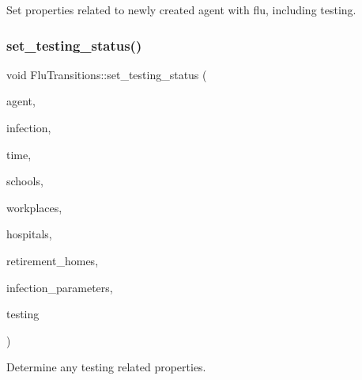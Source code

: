 Set properties related to newly created agent with flu, including testing. 

\mbox{\label{classFluTransitions_afc03327751ab451fff24c4d6a499f09f}} 
\subsubsection{\texorpdfstring{set\+\_\+testing\+\_\+status()}{set\_testing\_status()}}
{\footnotesize\ttfamily void Flu\+Transitions\+::set\+\_\+testing\+\_\+status (\begin{DoxyParamCaption}\item[{\hyperlink{classAgent}{Agent} \&}]{agent,  }\item[{\hyperlink{classInfection}{Infection} \&}]{infection,  }\item[{const double}]{time,  }\item[{std\+::vector$<$ \hyperlink{classSchool}{School} $>$ \&}]{schools,  }\item[{std\+::vector$<$ \hyperlink{classWorkplace}{Workplace} $>$ \&}]{workplaces,  }\item[{std\+::vector$<$ \hyperlink{classHospital}{Hospital} $>$ \&}]{hospitals,  }\item[{std\+::vector$<$ \hyperlink{classRetirementHome}{Retirement\+Home} $>$ \&}]{retirement\+\_\+homes,  }\item[{const std\+::map$<$ std\+::string, double $>$ \&}]{infection\+\_\+parameters,  }\item[{const \hyperlink{classTesting}{Testing} \&}]{testing }\end{DoxyParamCaption})}



Determine any testing related properties. 

\mbox{\label{classFluTransitions_a1e195475810b983e2d669fdd04aa5590}} 
